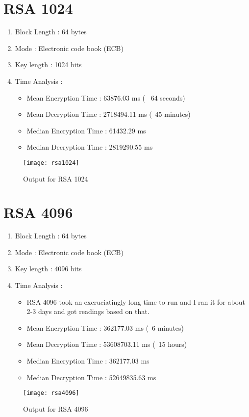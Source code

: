 \documentclass[11pt, pdftex]{article}
\begin{document}
\section{RSA 1024}
\begin{enumerate}
	\item Block Length : 64 bytes
	\item Mode : Electronic code book (ECB)
	\item Key length : 1024 bits
	\item Time Analysis : 
	\begin{itemize}
		\item Mean Encryption Time : 63876.03 ms (~ 64 seconds)
		\item Mean Decryption Time : 2718494.11 ms (~45 minutes)
		\item Median Encryption Time : 61432.29 ms 
		\item Median Decryption Time : 2819290.55 ms
	\end{itemize}
\end{enumerate}
\begin{figure}[t]
	\caption{Output for RSA 1024}
	\centering
	\texttt{[image: rsa1024]}
\end{figure}
\newpage
\section{RSA 4096}
\begin{enumerate}
	\item Block Length : 64 bytes
	\item Mode : Electronic code book (ECB)
	\item Key length : 4096 bits
	\item Time Analysis : 
	\begin{itemize}
		\item RSA 4096 took an excruciatingly long time to run and I ran it for about 2-3 days and got readings based on that.
		\item Mean Encryption Time : 362177.03 ms (~6 minutes)
		\item Mean Decryption Time : 53608703.11 ms (~15 hours)
		\item Median Encryption Time : 362177.03 ms
		\item Median Decryption Time : 52649835.63 ms
	\end{itemize}
\end{enumerate}
\begin{figure}[t]
	\caption{Output for RSA 4096}
	\centering
	\texttt{[image: rsa4096]}
\end{figure}
\newpage
\end{document}
